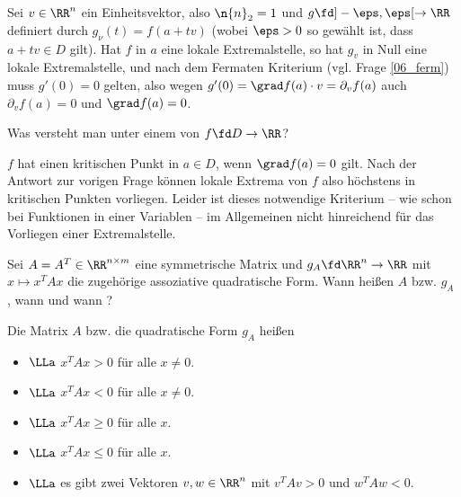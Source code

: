 \begin{antwort}
  Sei $v\in \RR^n$ ein Einheitsvektor, also $\n{ n }_2=1$ und 
  $g \fd ]-\eps,\eps [ \to \RR$ definiert durch 
  $g_\nu(t)=f(a+tv)$ (wobei $\eps>0$ so gewählt ist, dass 
  $a+tv\in D$ gilt). 
  Hat $f$ in $a$ eine lokale Extremalstelle, so hat $g_v$ in Null eine 
  lokale Extremalstelle, und nach dem Fermat\sch en Kriterium (vgl. Frage 
  \ref{06_ferm}) muss $g'(0)=0$ gelten, also wegen 
  $g'(0)=\grad f(a)\cdot v = \partial_v f(a)$ auch $\partial_v f(a)=0$ und 
  $\grad f(a) =0$. 
  \AntEnd
\end{antwort}

\begin{frage}
  Was versteht man unter einem  von $f \fd D \to\RR$?
\end{frage}

\begin{antwort}
  $f$ hat einen kritischen Punkt in $a\in D$, wenn $\grad f(a)=0$ gilt. 
  Nach der Antwort zur vorigen Frage können lokale Extrema von $f$ also 
  höchstens in kritischen Punkten vorliegen. Leider ist dieses notwendige 
  Kriterium -- wie schon bei Funktionen in einer Variablen -- 
  im Allgemeinen nicht hinreichend für das Vorliegen einer Extremalstelle. 
  \AntEnd
\end{antwort}

\begin{frage}
  Sei $A= A^T \in \RR^{n\times m}$ eine symmetrische Matrix und 
  $g_A \fd \RR^n \to \RR$ mit $x\mapsto x^T A x$ die zugehörige 
  assoziative quadratische Form. Wann heißen $A$ bzw. $g_A$ 
  , wann  
  und wann ?
\end{frage}

\begin{antwort}
  Die Matrix $A$ bzw. die quadratische Form $g_A$ heißen 
  \begin{itemize}
  \item {} $\LLa$ $x^T A x >0$ für alle $x\not= 0$.
  \item {} $\LLa$ $x^T A x < 0$ für alle $x\not=0$.
  \item {} $\LLa$ $x^T A x \ge0$ für alle $x$.
  \item {} $\LLa$ $x^T A x \le0$ für alle $x$.
  \item {} $\LLa$ es gibt zwei Vektoren $v,w \in \RR^n$ mit 
    $v^T A v >0$ und $w^T A w < 0$. \AntEnd
  \end{itemize}
\end{antwort}


